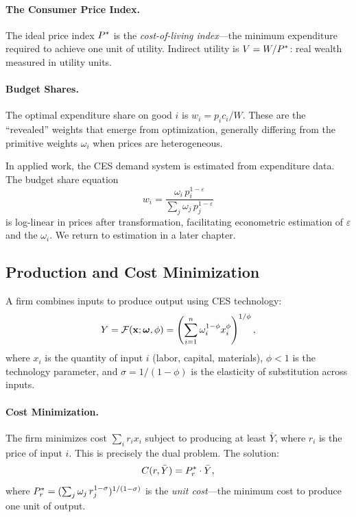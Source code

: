 \paragraph{The Consumer Price Index.}
The ideal price index $P^{*}$ is the \emph{cost-of-living index}---the minimum expenditure required to achieve one unit of utility. Indirect utility is $V = W / P^{*}$: real wealth measured in utility units.

\paragraph{Budget Shares.}
The optimal expenditure share on good $i$ is $w_i = p_i c_i / W$. These are the ``revealed'' weights that emerge from optimization, generally differing from the primitive weights $\omega_i$ when prices are heterogeneous.

\begin{calloutnote}
In applied work, the CES demand system is estimated from expenditure data. The budget share equation
\[
w_i = \frac{\omega_i \, p_i^{1-\varepsilon}}{\sum_j \omega_j \, p_j^{1-\varepsilon}}
\]
is log-linear in prices after transformation, facilitating econometric estimation of $\varepsilon$ and the $\omega_i$. We return to estimation in a later chapter.
\end{calloutnote}

\subsection{Production and Cost Minimization}
\label{subsec:production}

A firm combines inputs to produce output using CES technology:
\begin{equation}
Y = \mathcal{F}(\mathbf{x}; \boldsymbol{\omega}, \phi) = \left( \sum_{i=1}^{n} \omega_i^{1-\phi} x_i^{\phi} \right)^{1/\phi},
\end{equation}
where $x_i$ is the quantity of input $i$ (labor, capital, materials), $\phi < 1$ is the technology parameter, and $\sigma = 1/(1-\phi)$ is the elasticity of substitution across inputs.

\paragraph{Cost Minimization.}
The firm minimizes cost $\sum_i r_i x_i$ subject to producing at least $\bar{Y}$, where $r_i$ is the price of input $i$. This is precisely the dual problem. The solution:
\begin{equation}
C(r, \bar{Y}) = P^{*}_r \cdot \bar{Y},
\end{equation}
where $P^{*}_r = (\sum_j \omega_j \, r_j^{1-\sigma})^{1/(1-\sigma)}$ is the \emph{unit cost}---the minimum cost to produce one unit of output.

